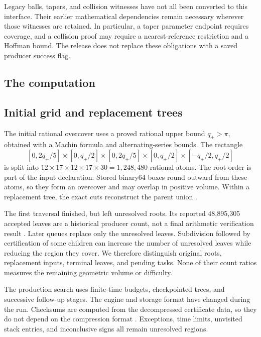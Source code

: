 \documentclass[11pt]{amsart}
\theoremstyle{definition}
\theoremstyle{remark}
\begin{document}
Legacy balls, tapers, and collision witnesses have not all been converted
to this interface. Their earlier mathematical dependencies remain
necessary wherever those witnesses are retained. In particular, a taper
parameter endpoint requires coverage, and a collision proof may require
a nearest-reference restriction and a Hoffman bound. The release does
not replace these obligations with a saved producer success flag.



\begin{samepage}
\section{The computation}\label{sec:computation}

\subsection{Initial grid and replacement trees}
The initial rational overcover uses a proved rational upper bound
$q_+>\pi$, obtained with a Machin formula and alternating-series bounds.
The rectangle
\[
 [0,2q_+/5]\times[0,q_+/2]\times[0,2q_+/5]\times[0,q_+/2]
                                  \times[-q_+/2,q_+/2]
\]
is split into $12\times17\times12\times17\times30=1{,}248{,}480$
rational atoms. The root order is part of the input declaration. Stored
binary64 boxes round outward from these atoms, so they form an
overcover and may overlap in positive volume. Within a replacement tree,
the exact cuts reconstruct the parent union \cite{input,verifier}.
\end{samepage}

The first traversal finished, but left unresolved roots. Its reported
48,895,305 accepted leaves are a historical producer count, not a final
arithmetic verification result \cite{map}. Later queues replace only the
unresolved leaves. Subdivision followed by certification of some children
can increase the number of unresolved leaves while reducing the region
they cover. We therefore distinguish original roots,
replacement inputs, terminal leaves, and pending tasks. None of their
count ratios measures the remaining geometric volume or difficulty.

The production search uses finite-time budgets, checkpointed trees, and
successive follow-up stages. The engine and storage format have changed
during the run. Checksums are computed from the decompressed certificate
data, so they do not depend on the compression format \cite{operations}.
Exceptions, time limits, unvisited stack entries, and
inconclusive signs all remain unresolved regions.
\end{document}
